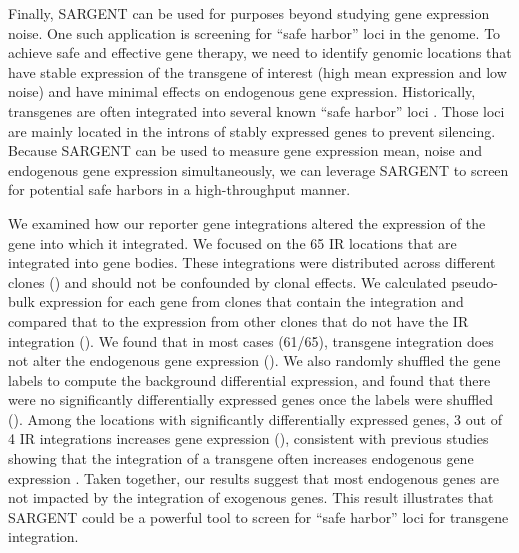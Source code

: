 Finally, SARGENT can be used for purposes beyond studying gene expression noise. One such application is screening for \enquote{safe harbor} loci in the genome. To achieve safe and effective gene therapy, we need to identify genomic locations that have stable expression of the transgene of interest (high mean expression and low noise) and have minimal effects on endogenous gene expression. Historically, transgenes are often integrated into several known \enquote{safe harbor} loci \cite{aznauryane_reddyst:DiscoveryValidation2022}. Those loci are mainly located in the introns of stably expressed genes to prevent silencing. Because SARGENT can be used to measure gene expression mean, noise and endogenous gene expression simultaneously, we can leverage SARGENT to screen for potential safe harbors in a high-throughput manner. 

We examined how our reporter gene integrations altered the expression of the gene into which it integrated. We focused on the 65 IR locations that are integrated into gene bodies. These integrations were distributed across different clones () and should not be confounded by clonal effects. We calculated pseudo-bulk expression for each gene from clones that contain the integration and compared that to the expression from other clones that do not have the IR integration (). We found that in most cases (61/65), transgene integration does not alter the endogenous gene expression (). We also randomly shuffled the gene labels to compute the background differential expression, and found that there were no significantly differentially expressed genes once the labels were shuffled (). Among the locations with significantly differentially expressed genes, 3 out of 4 IR integrations increases gene expression (), consistent with previous studies showing that the integration of a transgene often increases endogenous gene expression \cite{papapetrouep_schambacha:GeneInsertion2016}. Taken together, our results suggest that most endogenous genes are not impacted by the integration of exogenous genes. This result illustrates that SARGENT could be a powerful tool to screen for \enquote{safe harbor} loci for transgene integration.

